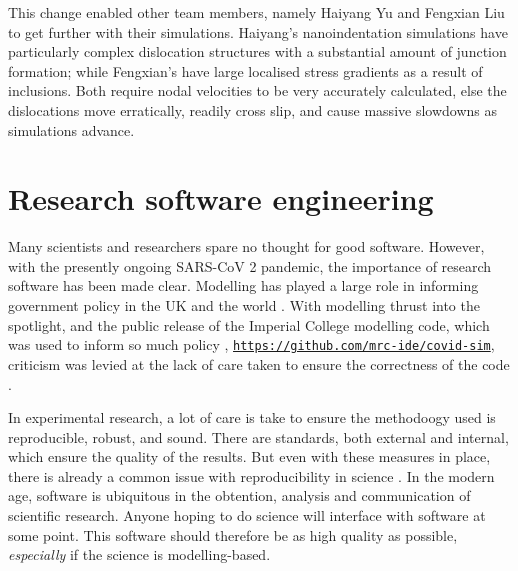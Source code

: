 This change enabled other team members, namely Haiyang Yu and Fengxian Liu to get further with their simulations. Haiyang's nanoindentation simulations have particularly complex dislocation structures with a substantial amount of junction formation; while Fengxian's have large localised stress gradients as a result of inclusions. Both require nodal velocities to be very accurately calculated, else the dislocations move erratically, readily cross slip, and cause massive slowdowns as simulations advance.

\section{Research software engineering}
\label{s:rse}

Many scientists and researchers spare no thought for good software. However, with the presently ongoing SARS-CoV 2 pandemic, the importance of research software has been made clear. Modelling has played a large role in informing government policy in the UK and the world \cite{covidScotland,covidUK1,covidUK2}. With modelling thrust into the spotlight, and the public release of the Imperial College modelling code, which was used to inform so much policy \cite{covidUK2}, \href{https://github.com/mrc-ide/covid-sim}{\texttt{https://github.com/mrc-ide/covid-sim}}, criticism was levied at the lack of care taken to ensure the correctness of the code \cite{natureModelCritique}.

In experimental research, a lot of care is take to ensure the methodoogy used is reproducible, robust, and sound. There are standards, both external and internal, which ensure the quality of the results. But even with these measures in place, there is already a common issue with reproducibility in science \cite{mede2020replication,randall2018irreproducibility,bolli2015reflections}. In the modern age, software is ubiquitous in the obtention, analysis and communication of scientific research. Anyone hoping to do science will interface with software at some point. This software should therefore be as high quality as possible, \emph{especially} if the science is modelling-based.

